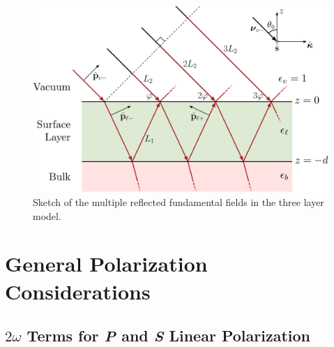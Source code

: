 \documentclass[aps,pra,10pt,amsmath,twocolumn,letterpaper]{revtex4-1}
\begin{document}
\begin{figure}[t]
\centering 
\includegraphics[width=\linewidth]{../content/figures/diag-3layer_MR_1w}
\caption{Sketch of the multiple reflected fundamental fields in the three layer
model.}\label{fig:MR3layer1w}
\end{figure}




\section{General Polarization Considerations}


\subsection{\texorpdfstring{$2\omega$}{2w} Terms for \emph{P} and \emph{S}
Linear Polarization}
\end{document}
